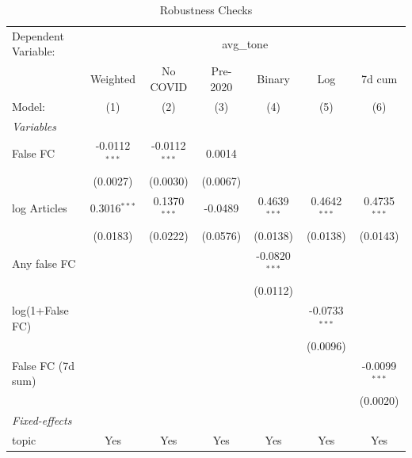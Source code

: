 
\begin{table}[htbp]
   \caption{\label{tab:robust} Robustness Checks}
   \centering
   \footnotesize
   \setlength{\tabcolsep}{3pt}
   \begin{tabular}{lcccccc}
      \tabularnewline \midrule \midrule
      Dependent Variable: & \multicolumn{6}{c}{avg\_tone}\\
                        & Weighted        & No COVID        & Pre-2020 & Binary          & Log             & 7d cum \\   
      Model:            & (1)             & (2)             & (3)      & (4)             & (5)             & (6)\\  
      \midrule
      \emph{Variables}\\
      False FC          & -0.0112$^{***}$ & -0.0112$^{***}$ & 0.0014   &                 &                 &   \\   
                        & (0.0027)        & (0.0030)        & (0.0067) &                 &                 &   \\   
      log Articles      & 0.3016$^{***}$  & 0.1370$^{***}$  & -0.0489  & 0.4639$^{***}$  & 0.4642$^{***}$  & 0.4735$^{***}$\\   
                        & (0.0183)        & (0.0222)        & (0.0576) & (0.0138)        & (0.0138)        & (0.0143)\\   
      Any false FC      &                 &                 &          & -0.0820$^{***}$ &                 &   \\   
                        &                 &                 &          & (0.0112)        &                 &   \\   
      log(1+False FC)   &                 &                 &          &                 & -0.0733$^{***}$ &   \\   
                        &                 &                 &          &                 & (0.0096)        &   \\   
      False FC (7d sum) &                 &                 &          &                 &                 & -0.0099$^{***}$\\   
                        &                 &                 &          &                 &                 & (0.0020)\\   
      \midrule
      \emph{Fixed-effects}\\
      topic             & Yes             & Yes             & Yes      & Yes             & Yes             & Yes\\  

\end{tabular}
\end{table}
